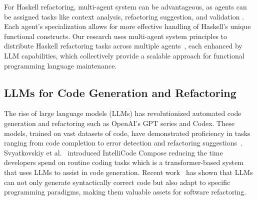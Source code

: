 
For Haskell refactoring, multi-agent system can be advantageous, as agents can be assigned tasks like context analysis, refactoring suggestion, and validation \cite{dos2015autorefactoring}. Each agent’s specialization allows for more effective handling of Haskell’s unique functional constructs. Our research uses multi-agent system principles to distribute Haskell refactoring tasks across multiple agents~\cite{guo2024large}, each enhanced by LLM capabilities, which collectively provide a scalable approach for functional programming language maintenance.

\subsection{LLMs for Code Generation and Refactoring}

The rise of large language models (LLMs) has revolutionized automated code generation and refactoring such as OpenAI’s GPT series and Codex. These models, trained on vast datasets of code, have demonstrated proficiency in tasks ranging from code completion to error detection and refactoring suggestions~\cite{chen2021evaluating}. Svyatkovskiy et al.~\cite{svyatkovskiy2020intellicode} introduced IntelliCode Compose reducing the time developers spend on routine coding tasks which is a transformer-based system that uses LLMs to assist in code generation. Recent work~\cite{white2024chatgpt}\cite{hou2024large} has shown that LLMs can not only generate syntactically correct code but also adapt to specific programming paradigms, making them valuable assets for software refactoring.

